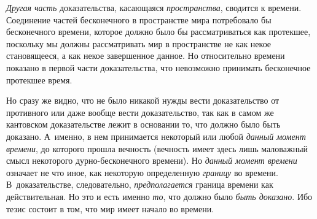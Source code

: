 {\em Другая часть} доказательства, касающаяся
{\em пространства}, сводится к времени. Соединение
частей бесконечного в пространстве мира потребовало бы бесконечного
времени, которое должно было бы рассматриваться как протекшее, поскольку мы
должны рассматривать мир в пространстве не как некое становящееся, а как
некое завершенное данное. Но относительно времени показано в первой части
доказательства, что невозможно принимать бесконечное протекшее время.

Но сразу же видно, что не было никакой нужды вести доказательство от
противного или даже вообще вести доказательство, так как в самом же
кантовском доказательстве лежит в основании то, что должно было быть
доказано. А~именно, в нем принимается некоторый или любой
{\em данный момент времени}, до которого прошла
вечность (вечность имеет здесь лишь маловажный смысл некоторого
дурно-бесконечного времени). Но {\em данный момент
времени} означает не что иное, как некоторую определенную
{\em границу} во времени. В~доказательстве,
следовательно, {\em предполагается} граница времени как
действительная. Но это и есть именно {\em то}, что
должно было {\em быть доказано}. Ибо тезис состоит в
том, что мир имеет начало во времени.


